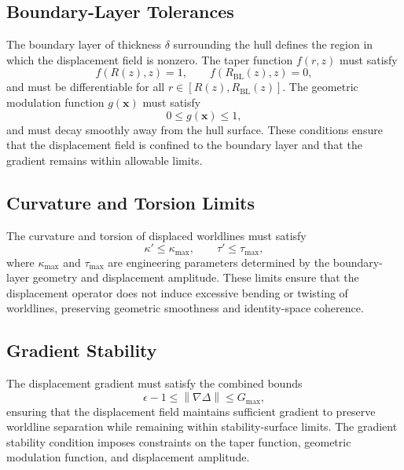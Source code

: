 \documentclass[aip,adv,reprint,floatfix]{revtex4-2}
\begin{document}
\subsection{Boundary-Layer Tolerances}

The boundary layer of thickness $\delta$ surrounding the hull defines the region in which the displacement field is nonzero. The taper function $f(r,z)$ must satisfy
\begin{equation}
f(R(z),z) = 1,
\qquad
f(R_{\mathrm{BL}}(z),z) = 0,
\end{equation}
and must be differentiable for all $r \in [R(z), R_{\mathrm{BL}}(z)]$. The geometric modulation function $g(\mathbf{x})$ must satisfy
\begin{equation}
0 \leq g(\mathbf{x}) \leq 1,
\end{equation}
and must decay smoothly away from the hull surface. These conditions ensure that the displacement field is confined to the boundary layer and that the gradient remains within allowable limits.

\subsection{Curvature and Torsion Limits}

The curvature and torsion of displaced worldlines must satisfy
\begin{equation}
\kappa' \leq \kappa_{\max},
\qquad
\tau' \leq \tau_{\max},
\end{equation}
where $\kappa_{\max}$ and $\tau_{\max}$ are engineering parameters determined by the boundary-layer geometry and displacement amplitude. These limits ensure that the displacement operator does not induce excessive bending or twisting of worldlines, preserving geometric smoothness and identity-space coherence.

\subsection{Gradient Stability}

The displacement gradient must satisfy the combined bounds
\begin{equation}
\epsilon - 1 \leq \left\| \nabla \Delta \right\| \leq G_{\max},
\end{equation}
ensuring that the displacement field maintains sufficient gradient to preserve worldline separation while remaining within stability-surface limits. The gradient stability condition imposes constraints on the taper function, geometric modulation function, and displacement amplitude.
\end{document}
